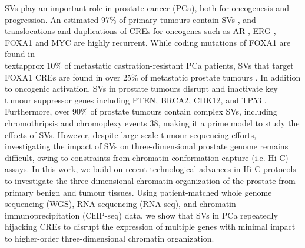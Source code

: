 SVs play an important role in prostate cancer (PCa), both for oncogenesis and progression.
An estimated 97\% of primary tumours contain SVs \cite{liPatternsSomaticStructural2020,fraserGenomicHallmarksLocalized2017}, and translocations and duplications of CREs for oncogenes such as AR \cite{takedaSomaticallyAcquiredEnhancer2018}, ERG \cite{rosenClinicalPotentialERG2012}, FOXA1 \cite{quigleyGenomicHallmarksStructural2018,paroliaDistinctStructuralClasses2019} and MYC \cite{paroliaDistinctStructuralClasses2019} are highly recurrent.
While coding mutations of FOXA1 are found in \\textapprox 10\% of metastatic castration-resistant PCa patients, SVs that target FOXA1 CREs are found in over 25\% of metastatic prostate tumours \cite{paroliaDistinctStructuralClasses2019}.
In addition to oncogenic activation, SVs in prostate tumours disrupt and inactivate key tumour suppressor genes including PTEN, BRCA2, CDK12, and TP53 \cite{quigleyGenomicHallmarksStructural2018,abeshouseMolecularTaxonomyPrimary2015}.
Furthermore, over 90\% of prostate tumours contain complex SVs, including chromothripsis and chromoplexy events 38, making it a prime model to study the effects of SVs.
However, despite large-scale tumour sequencing efforts, investigating the impact of SVs on three-dimensional prostate genome remains difficult, owing to constraints from chromatin conformation capture (i.e. Hi-C) assays.
In this work, we build on recent technological advances in Hi-C protocols to investigate the three-dimensional chromatin organization of the prostate from primary benign and tumour tissues.
Using patient-matched whole genome sequencing (WGS), RNA sequencing (RNA-seq), and chromatin immunoprecipitation (ChIP-seq) data, we show that SVs in PCa repeatedly hijacking CREs to disrupt the expression of multiple genes with minimal impact to higher-order three-dimensional chromatin organization.
